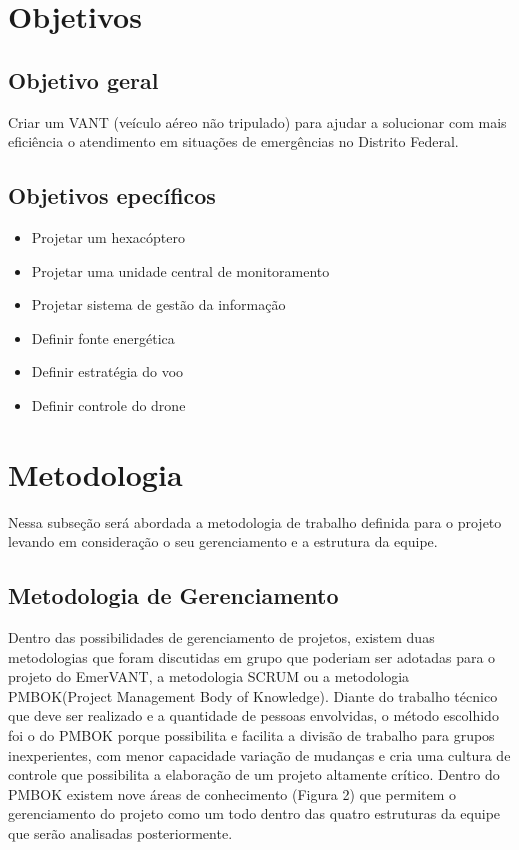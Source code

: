 \section{Objetivos}
\subsection{Objetivo geral}
	Criar um VANT (veículo aéreo não tripulado) para ajudar a solucionar com mais eficiência o atendimento em situações de emergências no Distrito Federal.
\subsection{Objetivos epecíficos}
\begin{itemize}
  \item Projetar um hexacóptero
  \item Projetar uma unidade central de monitoramento
	\item Projetar sistema de gestão da informação
	\item Definir fonte energética
	\item Definir estratégia do voo
	\item Definir controle do drone
\end{itemize}

\section{Metodologia}
Nessa subseção será abordada a metodologia de trabalho definida para o projeto levando em consideração o seu gerenciamento e a estrutura da equipe.
\subsection{Metodologia de Gerenciamento}

Dentro das possibilidades de gerenciamento de projetos, existem duas metodologias que foram discutidas em grupo que poderiam ser adotadas para o projeto do EmerVANT, a metodologia SCRUM ou a metodologia PMBOK(Project Management Body of Knowledge). Diante do trabalho técnico que deve ser realizado e a quantidade de pessoas envolvidas, o método escolhido foi o do PMBOK porque possibilita e facilita a divisão de trabalho para grupos inexperientes, com menor capacidade variação de mudanças e cria uma cultura de controle que possibilita a elaboração de um projeto altamente crítico. Dentro do PMBOK existem nove áreas de conhecimento (Figura 2) que permitem o gerenciamento do projeto como um todo dentro das quatro estruturas da equipe que serão analisadas posteriormente.

